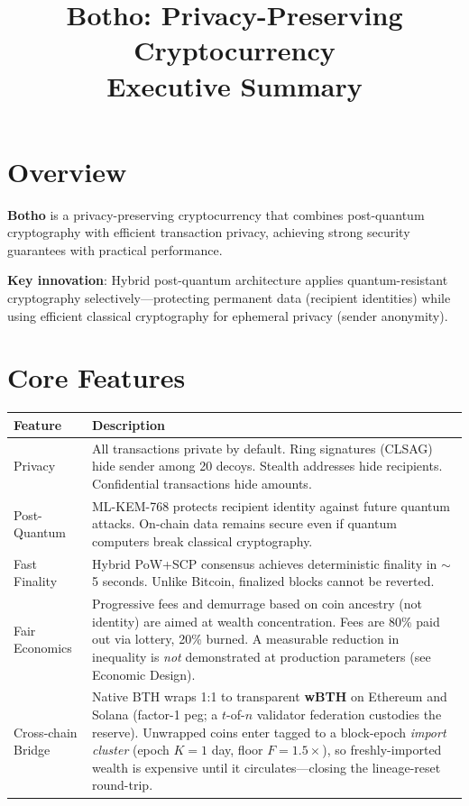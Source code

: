 \documentclass[11pt]{article}
\title{\vspace{-2em}\textbf{Botho: Privacy-Preserving Cryptocurrency}\\[0.3em]
\large Executive Summary}
\author{}
\date{}
\begin{document}
\maketitle
\vspace{-3em}

\section*{Overview}

\textbf{Botho} is a privacy-preserving cryptocurrency that combines post-quantum
cryptography with efficient transaction privacy, achieving strong security
guarantees with practical performance.

\textbf{Key innovation}: Hybrid post-quantum architecture applies quantum-resistant
cryptography selectively---protecting permanent data (recipient identities) while
using efficient classical cryptography for ephemeral privacy (sender anonymity).

\section*{Core Features}

\begin{tabular}{@{}p{3.5cm}p{10cm}@{}}
\toprule
\textbf{Feature} & \textbf{Description} \\
\midrule
Privacy & All transactions private by default. Ring signatures (CLSAG) hide
sender among 20 decoys. Stealth addresses hide recipients. Confidential
transactions hide amounts. \\[0.5em]
Post-Quantum & ML-KEM-768 protects recipient identity against future quantum
attacks. On-chain data remains secure even if quantum computers break
classical cryptography. \\[0.5em]
Fast Finality & Hybrid PoW+SCP consensus achieves deterministic finality in
$\sim$5 seconds. Unlike Bitcoin, finalized blocks cannot be reverted. \\[0.5em]
Fair Economics & Progressive fees and demurrage based on coin ancestry (not
identity) are aimed at wealth concentration. Fees are 80\% paid out via
lottery, 20\% burned. A measurable reduction in inequality is \emph{not}
demonstrated at production parameters (see Economic Design). \\[0.5em]
Cross-chain Bridge & Native BTH wraps 1:1 to transparent \textbf{wBTH} on
Ethereum and Solana (factor-1 peg; a \(t\)-of-\(n\) validator federation
custodies the reserve). Unwrapped coins enter tagged to a block-epoch
\emph{import cluster} (epoch \(K\!=\!1\) day, floor \(F\!=\!1.5\times\)), so
freshly-imported wealth is expensive until it circulates---closing the
lineage-reset round-trip. \\
\bottomrule
\end{tabular}
\end{document}
